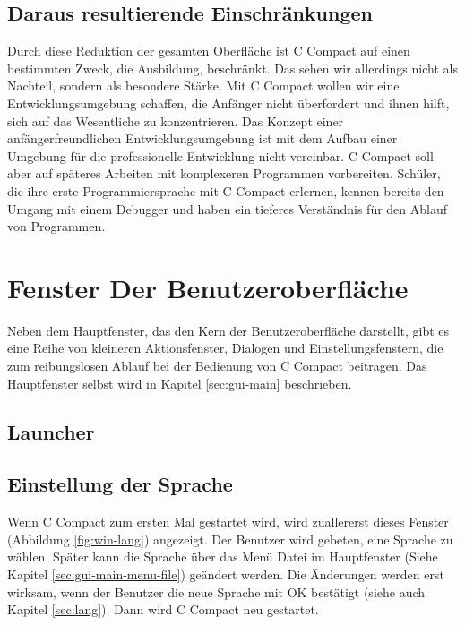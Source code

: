 \subsection{Daraus resultierende Einschränkungen}
Durch diese Reduktion der gesamten Oberfläche ist C Compact auf einen bestimmten Zweck, die Ausbildung, beschränkt. Das sehen wir allerdings nicht als Nachteil, sondern als besondere Stärke. Mit C Compact wollen wir eine Entwicklungsumgebung schaffen, die Anfänger nicht überfordert und ihnen hilft, sich auf das Wesentliche zu konzentrieren.
Das Konzept einer anfängerfreundlichen Entwicklungsumgebung ist mit dem Aufbau einer Umgebung für die professionelle Entwicklung nicht vereinbar. C Compact soll aber auf späteres Arbeiten mit komplexeren Programmen vorbereiten. Schüler, die ihre erste Programmiersprache mit C Compact erlernen, kennen bereits den Umgang mit einem Debugger und haben ein tieferes Verständnis für den Ablauf von Programmen.

\section{Fenster Der Benutzeroberfläche}
Neben dem Hauptfenster, das den Kern der Benutzeroberfläche darstellt, gibt es eine Reihe von kleineren Aktionsfenster, Dialogen und Einstellungsfenstern, die zum reibungslosen Ablauf bei der Bedienung von C Compact beitragen. Das Hauptfenster selbst wird in Kapitel \ref{sec:gui-main} beschrieben.

\subsection{Launcher}
\label{sec:win-launcher}


\subsection{Einstellung der Sprache}
\label{sec:win-lang}
Wenn C Compact zum ersten Mal gestartet wird, wird zuallererst dieses Fenster (Abbildung \ref{fig:win-lang}) angezeigt. Der Benutzer wird gebeten, eine Sprache zu wählen. Später kann die Sprache über das Menü \glqq{}Datei\grqq{} im Hauptfenster (Siehe Kapitel \ref{sec:gui-main-menu-file}) geändert werden. Die Änderungen werden erst wirksam, wenn der Benutzer die neue Sprache mit \glqq{}OK\grqq{} bestätigt (siehe auch Kapitel \ref{sec:lang}). Dann wird C Compact neu gestartet.


